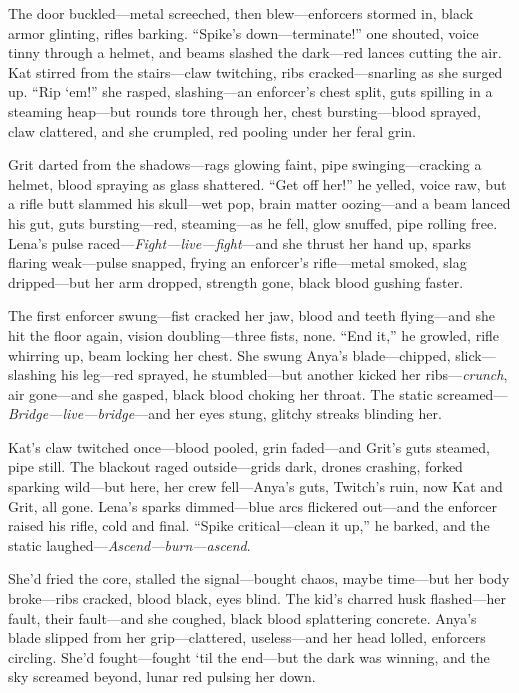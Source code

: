 \documentclass[12pt]{book}
\begin{document}
The door buckled---metal screeched, then blew---enforcers stormed in, black armor glinting, rifles barking. ``Spike’s down---terminate!'' one shouted, voice tinny through a helmet, and beams slashed the dark---red lances cutting the air. Kat stirred from the stairs---claw twitching, ribs cracked---snarling as she surged up. ``Rip ‘em!'' she rasped, slashing---an enforcer’s chest split, guts spilling in a steaming heap---but rounds tore through her, chest bursting---blood sprayed, claw clattered, and she crumpled, red pooling under her feral grin.

Grit darted from the shadows---rags glowing faint, pipe swinging---cracking a helmet, blood spraying as glass shattered. ``Get off her!'' he yelled, voice raw, but a rifle butt slammed his skull---wet pop, brain matter oozing---and a beam lanced his gut, guts bursting---red, steaming---as he fell, glow snuffed, pipe rolling free. Lena’s pulse raced---\emph{Fight---live---fight}---and she thrust her hand up, sparks flaring weak---pulse snapped, frying an enforcer’s rifle---metal smoked, slag dripped---but her arm dropped, strength gone, black blood gushing faster.

The first enforcer swung---fist cracked her jaw, blood and teeth flying---and she hit the floor again, vision doubling---three fists, none. ``End it,'' he growled, rifle whirring up, beam locking her chest. She swung Anya’s blade---chipped, slick---slashing his leg---red sprayed, he stumbled---but another kicked her ribs---\emph{crunch}, air gone---and she gasped, black blood choking her throat. The static screamed---\emph{Bridge---live---bridge}---and her eyes stung, glitchy streaks blinding her.

Kat’s claw twitched once---blood pooled, grin faded---and Grit’s guts steamed, pipe still. The blackout raged outside---grids dark, drones crashing, forked sparking wild---but here, her crew fell---Anya’s guts, Twitch’s ruin, now Kat and Grit, all gone. Lena’s sparks dimmed---blue arcs flickered out---and the enforcer raised his rifle, cold and final. ``Spike critical---clean it up,'' he barked, and the static laughed---\emph{Ascend---burn---ascend}.

She’d fried the core, stalled the signal---bought chaos, maybe time---but her body broke---ribs cracked, blood black, eyes blind. The kid’s charred husk flashed---her fault, their fault---and she coughed, black blood splattering concrete. Anya’s blade slipped from her grip---clattered, useless---and her head lolled, enforcers circling. She’d fought---fought ‘til the end---but the dark was winning, and the sky screamed beyond, lunar red pulsing her down.
\end{document}
